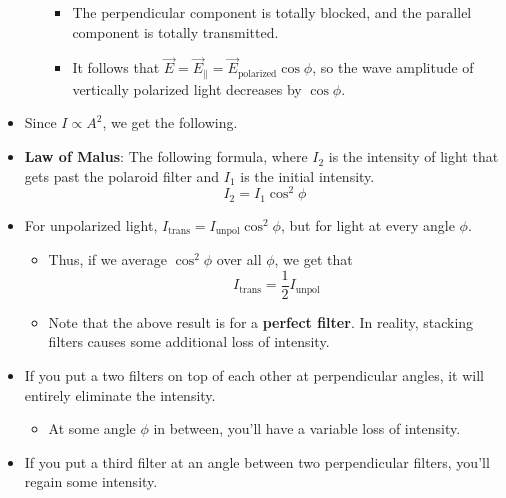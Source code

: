 \documentclass[../notes.tex]{subfiles}
\begin{document}
\begin{itemize}
\begin{itemize}
        \begin{itemize}
            \item The perpendicular component is totally blocked, and the parallel component is totally transmitted.
            \item It follows that $\vec{E}=\vec{E}_\parallel=\vec{E}_\text{polarized}\cos\phi$, so the wave amplitude of vertically polarized light decreases by $\cos\phi$.
        \end{itemize}
    \end{itemize}
    \item Since $I\propto A^2$, we get the following.
    \item \textbf{Law of Malus}: The following formula, where $I_2$ is the intensity of light that gets past the polaroid filter and $I_1$ is the initial intensity.
    \begin{equation*}
        I_2 = I_1\cos^2\phi
    \end{equation*}
    \item For unpolarized light, $I_\text{trans}=I_\text{unpol}\cos^2\phi$, but for light at every angle $\phi$.
    \begin{itemize}
        \item Thus, if we average $\cos^2\phi$ over all $\phi$, we get that
        \begin{equation*}
            I_\text{trans} = \frac{1}{2}I_\text{unpol}
        \end{equation*}
        \item Note that the above result is for a \textbf{perfect filter}. In reality, stacking filters causes some additional loss of intensity.
    \end{itemize}
    \item If you put a two filters on top of each other at perpendicular angles, it will entirely eliminate the intensity.
    \begin{itemize}
        \item At some angle $\phi$ in between, you'll have a variable loss of intensity.
    \end{itemize}
    \item If you put a third filter at an angle between two perpendicular filters, you'll regain some intensity.
\end{itemize}
\end{document}
